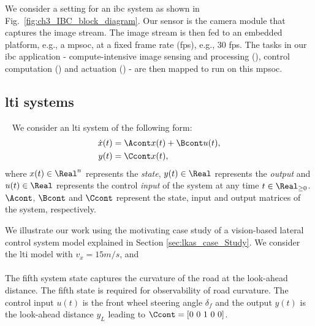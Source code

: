 We consider a setting for an \gls{ibc} system as shown in Fig.~\ref{fig:ch3_IBC_block_diagram}. Our sensor is the camera module that captures the image stream.
The image stream is then fed to an embedded platform, e.g., a \gls{mpsoc}, at a fixed frame rate (fps), e.g., 30 fps. The tasks in our \gls{ibc} application - compute-intensive image sensing and processing (\taskS), control computation (\taskC) and actuation (\taskA) -
are then mapped to run on this \gls{mpsoc}.

\subsection{\Gls{lti} systems}~\label{sec:ch3_LTI}
We consider an \gls{lti} system of the following form:
\begin{align}
\dot{x}(t) &= \Acont x(t) + \Bcont u(t), \label{eq:ch3_contsys}\\
y(t) &=  \Ccont x(t),\nonumber
\end{align}
where $x(t) \in \Real^n$ represents the {\it state}, $y(t) \in \Real$ represents the {\it output}  and $u(t) \in \Real$ represents the control {\it input} of the system at any time $t \in \Real_{\geq 0}$. $\Acont$, $\Bcont$ and $\Ccont$ represent the state, input and output matrices of the system, respectively. 

We illustrate our work using the motivating case study of a vision-based lateral control system model explained in Section \ref{sec:lkas_case_Study}. We consider the \gls{lti} model with $v_x=15$$m/s$, and
\\

\\[1.5ex]
The fifth system state captures the curvature of the road at the look-ahead distance. The fifth state is required for observability of road curvature. The control input $u(t)$ is the front wheel steering angle $\delta_f$ and the output $y(t)$ is the look-ahead distance $y_L$ leading to $\Ccont = [0\ 0\ 1\ 0\ 0]$.

